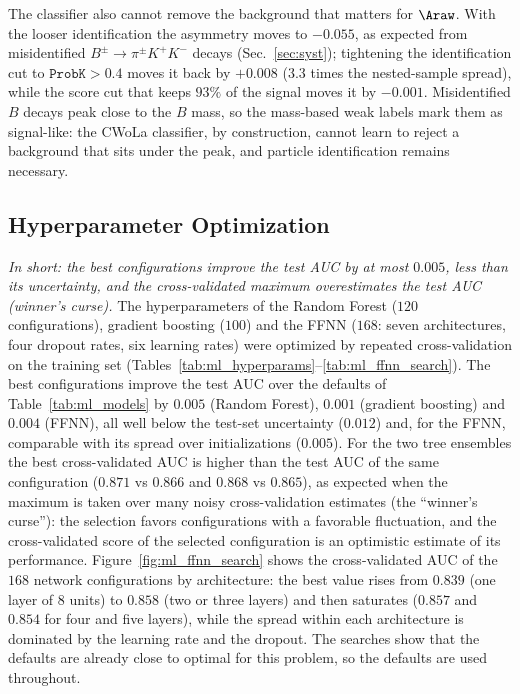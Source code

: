 The classifier also cannot remove the background that matters for $\Araw$. With the looser identification the asymmetry moves to $-0.055$, as expected from misidentified $B^\pm\to\pi^\pm K^+K^-$ decays (Sec.~\ref{sec:syst}); tightening the identification cut to $\texttt{ProbK}>0.4$ moves it back by $+0.008$ ($3.3$ times the nested-sample spread), while the score cut that keeps $93\%$ of the signal moves it by $-0.001$. Misidentified $B$ decays peak close to the $B$ mass, so the mass-based weak labels mark them as signal-like: the CWoLa classifier, by construction, cannot learn to reject a background that sits under the peak, and particle identification remains necessary.
\subsection{Hyperparameter Optimization}
\label{sec:ml_hyper}
\emph{In short: the best configurations improve the test AUC by at most $0.005$, less than its uncertainty, and the cross-validated maximum overestimates the test AUC (winner's curse).}
The hyperparameters of the Random Forest ($120$ configurations), gradient boosting ($100$) and the FFNN ($168$: seven architectures, four dropout rates, six learning rates) were optimized by repeated cross-validation on the training set (Tables~\ref{tab:ml_hyperparams}--\ref{tab:ml_ffnn_search}). The best configurations improve the test AUC over the defaults of Table~\ref{tab:ml_models} by $0.005$ (Random Forest), $0.001$ (gradient boosting) and $0.004$ (FFNN), all well below the test-set uncertainty ($0.012$) and, for the FFNN, comparable with its spread over initializations ($0.005$). For the two tree ensembles the best cross-validated AUC is higher than the test AUC of the same configuration ($0.871$ vs $0.866$ and $0.868$ vs $0.865$), as expected when the maximum is taken over many noisy cross-validation estimates (the ``winner's curse''): the selection favors configurations with a favorable fluctuation, and the cross-validated score of the selected configuration is an optimistic estimate of its performance. Figure~\ref{fig:ml_ffnn_search} shows the cross-validated AUC of the $168$ network configurations by architecture: the best value rises from $0.839$ (one layer of $8$ units) to $0.858$ (two or three layers) and then saturates ($0.857$ and $0.854$ for four and five layers), while the spread within each architecture is dominated by the learning rate and the dropout. The searches show that the defaults are already close to optimal for this problem, so the defaults are used throughout.

